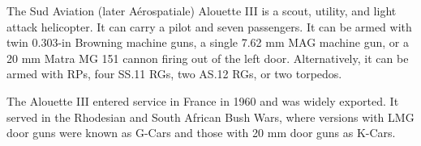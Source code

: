 

The Sud Aviation (later Aérospatiale) Alouette III is a scout, utility, and light attack helicopter. It can carry a pilot and seven passengers. It can be armed with twin 0.303-in Browning machine guns, a single 7.62 mm MAG machine gun, or a 20 mm Matra MG 151 cannon firing out of the left door. Alternatively, it can be armed with  RPs, four SS.11 RGs, two AS.12 RGs, or two torpedos.

The Alouette III entered service in France in 1960 and was widely exported. It served in the Rhodesian and South African Bush Wars, where versions with LMG door guns were known as G-Cars and those with 20 mm door guns as K-Cars.
